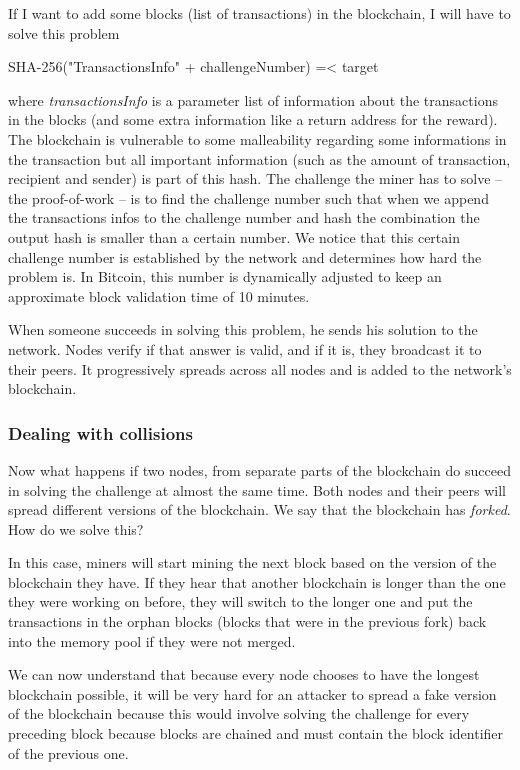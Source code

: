 \documentclass{vldb}
\begin{document}
If I want to add some blocks (list of transactions) in the blockchain, I will have to solve this problem
\begin{center}
SHA-256("TransactionsInfo" + challengeNumber) =< target
\end{center}
where \emph{transactionsInfo} is a parameter list of information about the transactions in the blocks (and some extra information like a return address for the reward). The blockchain is vulnerable to some malleability regarding some informations in the transaction but all important information (such as the amount of transaction, recipient and sender) is part of this hash.
The challenge the miner has to solve – the proof-of-work – is to find the challenge number such that when we append the transactions infos to the challenge number and hash the combination the output hash is smaller than a certain number.
We notice that this certain challenge number is established by the network and determines how hard the problem is. In Bitcoin, this number is dynamically adjusted to keep an approximate block validation time of 10 minutes.\cite{hashCash}

When someone succeeds in solving this problem, he sends his solution to the network. Nodes verify if that answer is valid, and if it is, they broadcast it to their peers. It progressively spreads across all nodes and is added to the network's blockchain. 

\subsubsection{Dealing with collisions}

Now what happens if two nodes, from separate parts of the blockchain do succeed in solving the challenge at almost the same time. Both nodes and their peers will spread different versions of the blockchain. We say that the blockchain has \emph{forked}. How do we solve this?

In this case, miners will start mining the next block based on the version of the blockchain they have. If they hear that another blockchain is longer than the one they were working on before, they will switch to the longer one and put the transactions in the orphan blocks (blocks that were in the previous fork) back into the memory pool if they were not merged. 

We can now understand that because every node chooses to have the longest blockchain possible, it will be very hard for an attacker to spread a fake version of the blockchain because this would involve solving the challenge for every preceding block because blocks are chained and must contain the block identifier of the previous one. 
\end{document}
